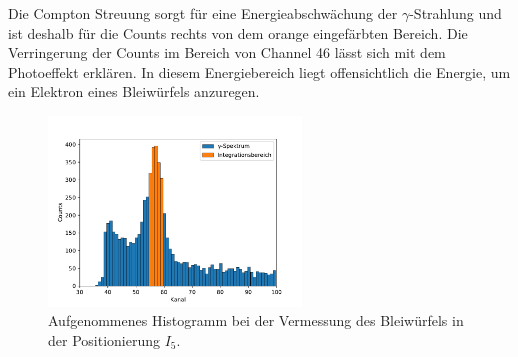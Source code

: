 Die Compton Streuung sorgt für eine Energieabschwächung der $\gamma$-Strahlung und ist deshalb für die Counts rechts von dem %
orange eingefärbten Bereich. Die Verringerung der Counts im Bereich von Channel 46 lässt sich mit dem Photoeffekt erklären.
In diesem Energiebereich liegt offensichtlich die Energie, um ein Elektron eines Bleiwürfels anzuregen.  %

\begin{figure}[h]
  \centering
  \includegraphics[width=0.6\textwidth]{hist/hist.pdf}
  \caption{Aufgenommenes Histogramm bei der Vermessung des Bleiwürfels in der Positionierung $I_5$.}
  \label{fig: histo}
\end{figure}
